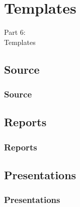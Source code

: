 {
\renewcommand{\bgcolor}{templates}

\section{Templates}
\begin{frame}
  \vspace{25mm}
  \begin{center}
    \Huge{Part 6:\\Templates}
  \end{center}
\end{frame}

\subsection{Source}
\begin{frame}[fragile]
  \frametitle{Source}
  \vspace{3mm}
  
\end{frame}

\subsection{Reports}
\begin{frame}[fragile]
  \frametitle{Reports}
  \vspace{3mm}
  
\end{frame}

\subsection{Presentations}
\begin{frame}[fragile]
  \frametitle{Presentations}
  \vspace{3mm}
  
\end{frame}

}



